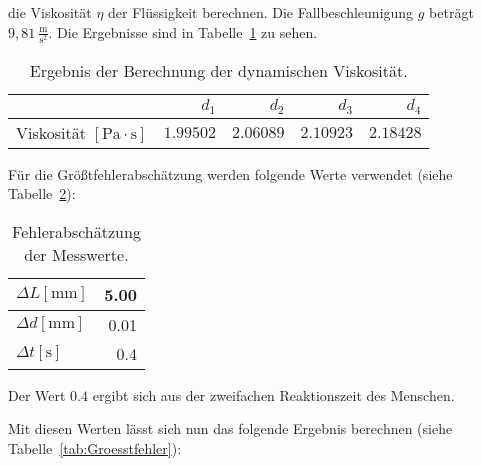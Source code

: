             die Viskosität $\eta$ der Flüssigkeit berechnen. Die Fallbeschleunigung $g$ beträgt $9,81\ \mathrm{\frac{m}{s^{2}}}$. Die Ergebnisse sind in Tabelle~\ref{tab:ErgebnisseDynViskosität} zu sehen.

            \begin{table}[H]
                \centering
                \caption{Ergebnis der Berechnung der dynamischen Viskosität.}
                \vspace*{.5em}
                \begin{tabular}{|l||r|r|r|r|}
                    \hline
                    & $d_{1}$ & $d_{2}$ & $d_{3}$ & $d_{4}$\\
                    \hline \hline
                    Viskosität $[\mathrm{Pa \cdot s}]$ & $1.99502$ & $2.06089$ & $2.10923$ & $2.18428$\\
                    \hline
                \end{tabular}
                \label{tab:ErgebnisseDynViskosität}
            \end{table}

            Für die Größtfehlerabschätzung werden folgende Werte verwendet (siehe Tabelle~\ref{tab:Fehlerabschaetzung}):

            \begin{table}[H]
                \centering
                \caption{Fehlerabschätzung der Messwerte.}
                \vspace*{.5em}
                \begin{tabular}{|l||r|}
                    \hline
                    $\Delta L [\mathrm{mm}]$ & 5.00\\
                    \hline
                    $\Delta d [\mathrm{mm}]$ & 0.01\\
                    \hline
                    $\Delta t [\mathrm{s}]$ & 0.4\\
                    \hline
                \end{tabular}
                \label{tab:Fehlerabschaetzung}
            \end{table}

            Der Wert $0.4$ ergibt sich aus der zweifachen Reaktionszeit des Menschen.

            Mit diesen Werten lässt sich nun das folgende Ergebnis berechnen (siehe Tabelle~\ref{tab:Groesstfehler}):

